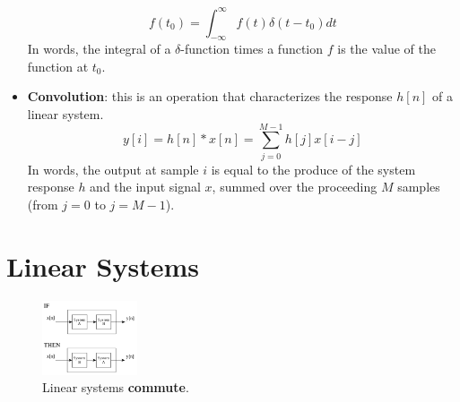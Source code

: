 \documentclass{article}
\begin{document}
\begin{itemize}
\begin{equation}
f(t_0) = \int_{-\infty}^{\infty} f(t) \delta(t-t_0) dt \label{eq:delta}
\end{equation}
In words, the integral of a $\delta$-function times a function $f$ is the value of the function at $t_0$.
\item \textbf{Convolution}: this is an operation that characterizes the response $h[n]$ of a linear system.
\begin{equation}
y[i] = h[n] * x[n] = \sum_{j=0}^{M-1}h[j]x[i-j] \label{eq:conv}
\end{equation}
In words, the output at sample $i$ is equal to the produce of the system response $h$ and the input signal $x$, summed over the proceeding $M$ samples (from $j=0$ to $j=M-1$).
\end{itemize} \vspace{3cm}
\normalsize

\section{Linear Systems}

\begin{figure}[ht]
\centering
\includegraphics[width=0.25\textwidth]{commute.png}
\caption{\label{fig:1} Linear systems \textbf{commute}.}
\end{figure}
\end{document}
